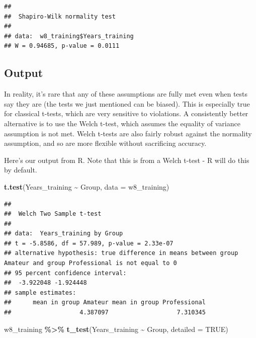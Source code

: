 \documentclass[
]{book}
\newenvironment{Shaded}{\begin{snugshade}}{\end{snugshade}}
\newcommand{\AttributeTok}[1]{\textcolor[rgb]{0.13,0.29,0.53}{#1}}
\newcommand{\ConstantTok}[1]{\textcolor[rgb]{0.56,0.35,0.01}{#1}}
\newcommand{\FunctionTok}[1]{\textcolor[rgb]{0.13,0.29,0.53}{\textbf{#1}}}
\newcommand{\NormalTok}[1]{#1}
\newcommand{\SpecialCharTok}[1]{\textcolor[rgb]{0.81,0.36,0.00}{\textbf{#1}}}
\begin{document}
\begin{Shaded}
\end{Shaded}

\begin{verbatim}
## 
##  Shapiro-Wilk normality test
## 
## data:  w8_training$Years_training
## W = 0.94685, p-value = 0.0111
\end{verbatim}

\subsection{Output}\label{output-3}

In reality, it's rare that any of these assumptions are fully met even when tests say they are (the tests we just mentioned can be biased). This is especially true for classical t-tests, which are very sensitive to violations. A consistently better alternative is to use the Welch t-test, which assumes the equality of variance assumption is not met. Welch t-tests are also fairly robust against the normality assumption, and so are more flexible without sacrificing accuracy.

Here's our output from R. Note that this is from a Welch t-test - R will do this by default.

\begin{Shaded}
\begin{Highlighting}[]
\FunctionTok{t.test}\NormalTok{(Years\_training }\SpecialCharTok{\textasciitilde{}}\NormalTok{ Group, }\AttributeTok{data =}\NormalTok{ w8\_training)}
\end{Highlighting}
\end{Shaded}

\begin{verbatim}
## 
##  Welch Two Sample t-test
## 
## data:  Years_training by Group
## t = -5.8586, df = 57.989, p-value = 2.33e-07
## alternative hypothesis: true difference in means between group Amateur and group Professional is not equal to 0
## 95 percent confidence interval:
##  -3.922048 -1.924448
## sample estimates:
##      mean in group Amateur mean in group Professional 
##                   4.387097                   7.310345
\end{verbatim}

\begin{Shaded}
\begin{Highlighting}[]
\NormalTok{w8\_training }\SpecialCharTok{\%\textgreater{}\%}
  \FunctionTok{t\_test}\NormalTok{(Years\_training }\SpecialCharTok{\textasciitilde{}}\NormalTok{ Group, }\AttributeTok{detailed =} \ConstantTok{TRUE}\NormalTok{)}
\end{Highlighting}
\end{Shaded}
\end{document}
